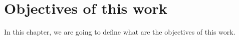 \chapter{Objectives of this work}

\label{kap:workObjectives} %

In this chapter, we are going to define what are the objectives of this work.
